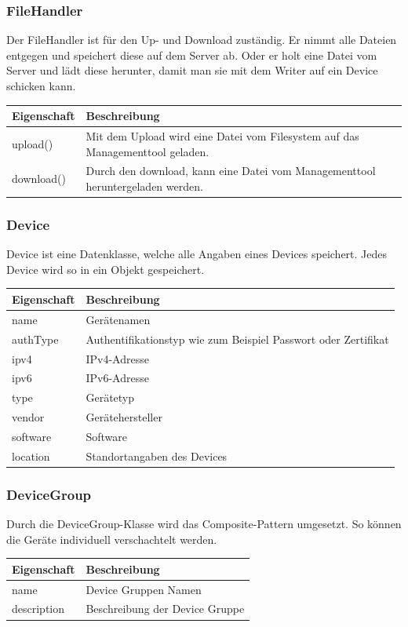\subsubsection{FileHandler}
Der FileHandler ist für den Up- und Download zuständig. Er nimmt alle Dateien entgegen und speichert diese auf dem Server ab. Oder er holt eine Datei vom Server und lädt diese herunter, damit man sie mit dem Writer auf ein Device schicken kann.
\begin{table}[H]
\centering
    \begin{tabular}{@{}l p{14.1cm} @{}}\toprule    
    {Eigenschaft} & {Beschreibung}\\ \midrule 
    upload() & Mit dem Upload wird eine Datei vom Filesystem auf das Managementtool geladen. \\
    download() & Durch den download, kann eine Datei vom Managementtool heruntergeladen werden. \\
    \bottomrule
    \end{tabular}
\end{table}

\subsubsection{Device}
Device ist eine Datenklasse, welche alle Angaben eines Devices speichert. Jedes Device wird so in ein Objekt gespeichert.
\begin{table}[H]
\centering
    \begin{tabular}{@{}l p{14.1cm} @{}}\toprule    
    {Eigenschaft} & {Beschreibung}\\ \midrule      
    name & Gerätenamen \\
    authType & Authentifikationstyp wie zum Beispiel Passwort oder Zertifikat  \\
    ipv4 &  IPv4-Adresse\\
    ipv6 &  IPv6-Adresse\\
    type &  Gerätetyp\\
    vendor & Gerätehersteller \\
    software & Software \\
	location &  Standortangaben des Devices\\    
    \bottomrule
    \end{tabular}
\end{table}

\subsubsection{DeviceGroup}
Durch die DeviceGroup-Klasse wird das Composite-Pattern umgesetzt. So können die Geräte individuell verschachtelt werden.
\begin{table}[H]
\centering
    \begin{tabular}{@{}l p{14.1cm} @{}}\toprule    
    {Eigenschaft} & {Beschreibung}\\ \midrule      
    name & Device Gruppen Namen\\
    description & Beschreibung der Device Gruppe \\
    \bottomrule
    \end{tabular}
\end{table}

